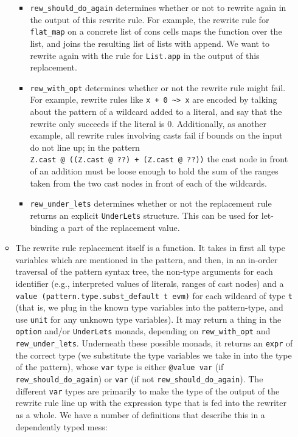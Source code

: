 \begin{itemize}
\begin{itemize}
    \begin{itemize}
    \tightlist
    \item
      \texttt{rew\_should\_do\_again} determines whether or not to
      rewrite again in the output of this rewrite rule. For example, the
      rewrite rule for \texttt{flat\_map} on a concrete list of cons
      cells maps the function over the list, and joins the resulting
      list of lists with append. We want to rewrite again with the rule
      for \texttt{List.app} in the output of this replacement.
    \item
      \texttt{rew\_with\_opt} determines whether or not the rewrite rule
      might fail. For example, rewrite rules like
      \texttt{x\ +\ 0\ \textasciitilde{}\textgreater{}\ x} are encoded
      by talking about the pattern of a wildcard added to a literal, and
      say that the rewrite only succeeds if the literal is 0.
      Additionally, as another example, all rewrite rules involving
      casts fail if bounds on the input do not line up; in the pattern
      \texttt{Z.cast\ @\ ((Z.cast\ @\ ??)\ +\ (Z.cast\ @\ ??))} the cast
      node in front of an addition must be loose enough to hold the sum
      of the ranges taken from the two cast nodes in front of each of
      the wildcards.
    \item
      \texttt{rew\_under\_lets} determines whether or not the
      replacement rule returns an explicit \texttt{UnderLets} structure.
      This can be used for let-binding a part of the replacement value.
    \end{itemize}
  \item
    The rewrite rule replacement itself is a function. It takes in first
    all type variables which are mentioned in the pattern, and then, in
    an in-order traversal of the pattern syntax tree, the non-type
    arguments for each identifier (e.g., interpreted values of literals,
    ranges of cast nodes) and a
    \texttt{value\ (pattern.type.subst\_default\ t\ evm)} for each
    wildcard of type \texttt{t} (that is, we plug in the known type
    variables into the pattern-type, and use \texttt{unit} for any
    unknown type variables). It may return a thing in the
    \texttt{option} and/or \texttt{UnderLets} monads, depending on
    \texttt{rew\_with\_opt} and \texttt{rew\_under\_lets}. Underneath
    these possible monads, it returns an \texttt{expr} of the correct
    type (we substitute the type variables we take in into the type of
    the pattern), whose \texttt{var} type is either \texttt{@value\ var}
    (if \texttt{rew\_should\_do\_again}) or \texttt{var} (if not
    \texttt{rew\_should\_do\_again}). The different \texttt{var} types
    are primarily to make the type of the output of the rewrite rule
    line up with the expression type that is fed into the rewriter as a
    whole. We have a number of definitions that describe this in a
    dependently typed mess:


\end{itemize}
\end{itemize}
